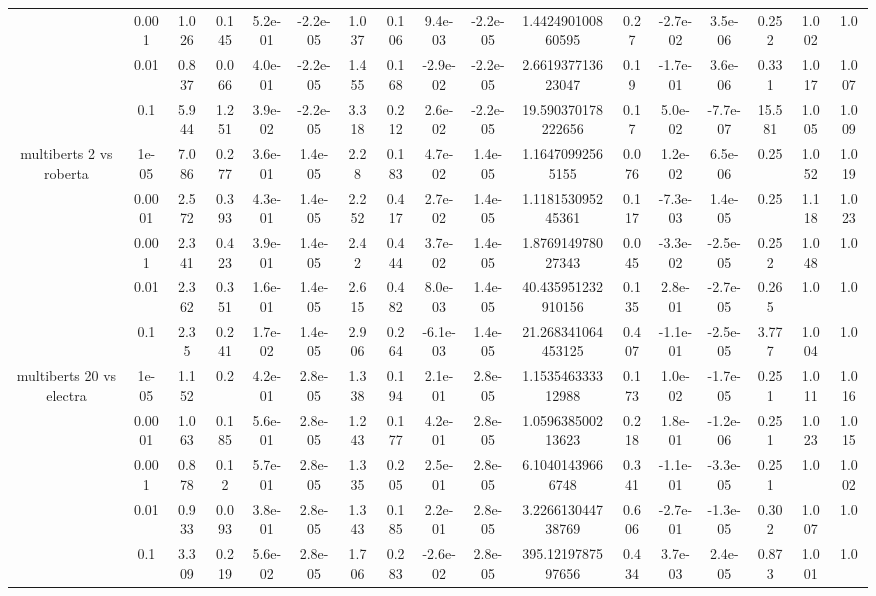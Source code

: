 \begin{tabular}{|c|c|c|c|c|c|c|c|c|c|c|c|c|c|c|c|c|}
 & 0.001 & 1.026 & 0.145 & 5.2e-01 & -2.2e-05 & 1.037 & 0.106 & 9.4e-03 & -2.2e-05 & 1.442490100860595 & 0.27 & -2.7e-02 & 3.5e-06 & 0.252 & 1.002 & 1.0 \\
 & 0.01 & 0.837 & 0.066 & 4.0e-01 & -2.2e-05 & 1.455 & 0.168 & -2.9e-02 & -2.2e-05 & 2.661937713623047 & 0.19 & -1.7e-01 & 3.6e-06 & 0.331 & 1.017 & 1.007 \\
 & 0.1 & 5.944 & 1.251 & 3.9e-02 & -2.2e-05 & 3.318 & 0.212 & 2.6e-02 & -2.2e-05 & 19.590370178222656 & 0.17 & 5.0e-02 & -7.7e-07 & 15.581 & 1.005 & 1.009 \\
\hline
\multirow{5}{*}{multiberts 2 vs roberta } & 1e-05 & 7.086 & 0.277 & 3.6e-01 & 1.4e-05 & 2.28 & 0.183 & 4.7e-02 & 1.4e-05 & 1.16470992565155 & 0.076 & 1.2e-02 & 6.5e-06 & 0.25 & 1.052 & 1.019 \\
 & 0.0001 & 2.572 & 0.393 & 4.3e-01 & 1.4e-05 & 2.252 & 0.417 & 2.7e-02 & 1.4e-05 & 1.118153095245361 & 0.117 & -7.3e-03 & 1.4e-05 & 0.25 & 1.118 & 1.023 \\
 & 0.001 & 2.341 & 0.423 & 3.9e-01 & 1.4e-05 & 2.42 & 0.444 & 3.7e-02 & 1.4e-05 & 1.876914978027343 & 0.045 & -3.3e-02 & -2.5e-05 & 0.252 & 1.048 & 1.0 \\
 & 0.01 & 2.362 & 0.351 & 1.6e-01 & 1.4e-05 & 2.615 & 0.482 & 8.0e-03 & 1.4e-05 & 40.435951232910156 & 0.135 & 2.8e-01 & -2.7e-05 & 0.265 & 1.0 & 1.0 \\
 & 0.1 & 2.35 & 0.241 & 1.7e-02 & 1.4e-05 & 2.906 & 0.264 & -6.1e-03 & 1.4e-05 & 21.268341064453125 & 0.407 & -1.1e-01 & -2.5e-05 & 3.777 & 1.004 & 1.0 \\
\hline
\multirow{5}{*}{multiberts 20 vs electra } & 1e-05 & 1.152 & 0.2 & 4.2e-01 & 2.8e-05 & 1.338 & 0.194 & 2.1e-01 & 2.8e-05 & 1.153546333312988 & 0.173 & 1.0e-02 & -1.7e-05 & 0.251 & 1.011 & 1.016 \\
 & 0.0001 & 1.063 & 0.185 & 5.6e-01 & 2.8e-05 & 1.243 & 0.177 & 4.2e-01 & 2.8e-05 & 1.059638500213623 & 0.218 & 1.8e-01 & -1.2e-06 & 0.251 & 1.023 & 1.015 \\
 & 0.001 & 0.878 & 0.12 & 5.7e-01 & 2.8e-05 & 1.335 & 0.205 & 2.5e-01 & 2.8e-05 & 6.10401439666748 & 0.341 & -1.1e-01 & -3.3e-05 & 0.251 & 1.0 & 1.002 \\
 & 0.01 & 0.933 & 0.093 & 3.8e-01 & 2.8e-05 & 1.343 & 0.185 & 2.2e-01 & 2.8e-05 & 3.226613044738769 & 0.606 & -2.7e-01 & -1.3e-05 & 0.302 & 1.007 & 1.0 \\
 & 0.1 & 3.309 & 0.219 & 5.6e-02 & 2.8e-05 & 1.706 & 0.283 & -2.6e-02 & 2.8e-05 & 395.1219787597656 & 0.434 & 3.7e-03 & 2.4e-05 & 0.873 & 1.001 & 1.0 \\

\end{tabular}
